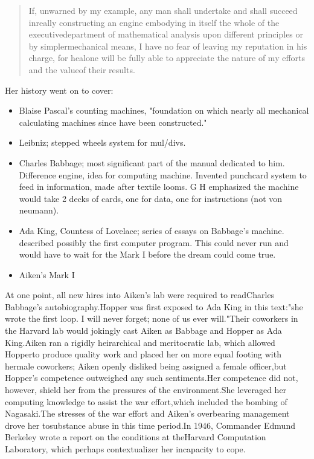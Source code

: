 \begin{quotation}If, unwarned by my example, any man shall undertake and shall succeed inreally constructing an engine embodying in itself the whole of the executivedepartment of mathematical analysis upon different principles or by simplermechanical means, I have no fear of leaving my reputation in his charge, for healone will be fully able to appreciate the nature of my efforts and the valueof their results.
\end{quotation}
Her history went on to cover:\begin{itemize}    \item Blaise Pascal's counting machines, "foundation on which nearly all mechanical
          calculating machines since have been constructed." \item Leibniz; stepped wheels system for mul/divs. \item Charles Babbage; most significant part of the manual dedicated to him.
          Difference engine, idea for computing machine. Invented punchcard system to
          feed in information, made after textile looms. G H emphasized the machine would
          take 2 decks of cards, one for data, one for instructions (not von neumann). \item Ada King, Countess of Lovelace; series of essays on Babbage's machine.
          described possibly the first computer program. This could never run and would
          have to wait for the Mark I before the dream could come true. \item Aiken's Mark I\end{itemize}At one point, all new hires into Aiken's lab were required to readCharles Babbage's autobiography.Hopper was first exposed to Ada King in this text:"she wrote the first loop. I will never forget; none of us ever will."Their coworkers in the Harvard lab would jokingly cast Aiken as Babbage and Hopper as Ada King.Aiken ran a rigidly heirarchical and meritocratic lab, which allowed Hopperto produce quality work and placed her on more equal footing with hermale coworkers; Aiken openly disliked being assigned a female officer,but Hopper's competence outweighed any such sentiments.Her competence did not, however, shield her from the pressures of the environment.She leveraged her computing knowledge to assist the war effort,which included the bombing of Nagasaki.The stresses of the war effort and Aiken's overbearing management drove her tosubstance abuse in this time period.In 1946, Commander Edmund Berkeley wrote a report on the conditions at theHarvard Computation Laboratory, which perhaps contextualizer her incapacity to cope.
